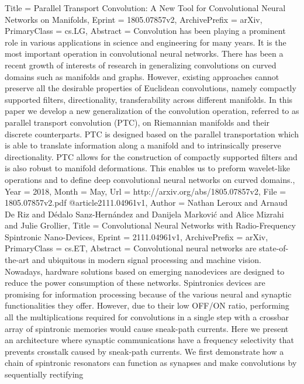 {{{{Title         = {Parallel Transport Convolution: A New Tool for Convolutional Neural
  Networks on Manifolds},
Eprint        = {1805.07857v2},
ArchivePrefix = {arXiv},
PrimaryClass  = {cs.LG},
Abstract      = {Convolution has been playing a prominent role in various applications in
science and engineering for many years. It is the most important operation in
convolutional neural networks. There has been a recent growth of interests of
research in generalizing convolutions on curved domains such as manifolds and
graphs. However, existing approaches cannot preserve all the desirable
properties of Euclidean convolutions, namely compactly supported filters,
directionality, transferability across different manifolds. In this paper we
develop a new generalization of the convolution operation, referred to as
parallel transport convolution (PTC), on Riemannian manifolds and their
discrete counterparts. PTC is designed based on the parallel transportation
which is able to translate information along a manifold and to intrinsically
preserve directionality. PTC allows for the construction of compactly supported
filters and is also robust to manifold deformations. This enables us to preform
wavelet-like operations and to define deep convolutional neural networks on
curved domains.},
Year          = {2018},
Month         = {May},
Url           = {http://arxiv.org/abs/1805.07857v2},
File          = {1805.07857v2.pdf}
}
@article{2111.04961v1,
Author        = {Nathan Leroux and Arnaud De Riz and Dédalo Sanz-Hernández and Danijela Marković and Alice Mizrahi and Julie Grollier},
Title         = {Convolutional Neural Networks with Radio-Frequency Spintronic
  Nano-Devices},
Eprint        = {2111.04961v1},
ArchivePrefix = {arXiv},
PrimaryClass  = {cs.ET},
Abstract      = {Convolutional neural networks are state-of-the-art and ubiquitous in modern
signal processing and machine vision. Nowadays, hardware solutions based on
emerging nanodevices are designed to reduce the power consumption of these
networks. Spintronics devices are promising for information processing because
of the various neural and synaptic functionalities they offer. However, due to
their low OFF/ON ratio, performing all the multiplications required for
convolutions in a single step with a crossbar array of spintronic memories
would cause sneak-path currents. Here we present an architecture where synaptic
communications have a frequency selectivity that prevents crosstalk caused by
sneak-path currents. We first demonstrate how a chain of spintronic resonators
can function as synapses and make convolutions by sequentially rectifying
}}}}}
